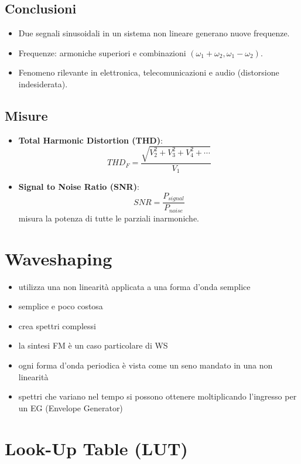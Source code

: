 \subsection*{Conclusioni}

\begin{itemize}
    \item Due segnali sinusoidali in un sistema non lineare generano nuove frequenze.
    \item Frequenze: armoniche superiori e combinazioni $(\omega_1 + \omega_2, \omega_1 - \omega_2)$.
    \item Fenomeno rilevante in elettronica, telecomunicazioni e audio (distorsione indesiderata).
\end{itemize}

\subsection*{Misure}
\begin{itemize}
    \item \textbf{Total Harmonic Distortion (THD)}:
    \[
    THD_F = \frac {\sqrt{V_2^2 + V_3^2 + V_4^2 + \cdots}}{V_1}
    \]
    
    \item \textbf{Signal to Noise Ratio (SNR)}:
    \[
    SNR = \frac{P_{signal}}{P_{noise}}
    \]
    misura la potenza di tutte le parziali inarmoniche.
\end{itemize}

\section{Waveshaping}

\begin{itemize}
    \item utilizza una non linearità applicata a una forma d’onda semplice
    \item semplice e poco costosa
    \item crea spettri complessi
    \item la sintesi FM è un caso particolare di WS
    \item ogni forma d’onda periodica è vista come un seno mandato in una non linearità
    \item spettri che variano nel tempo si possono ottenere moltiplicando l’ingresso per un EG (Envelope Generator)
\end{itemize}

\section*{Look-Up Table (LUT)}

